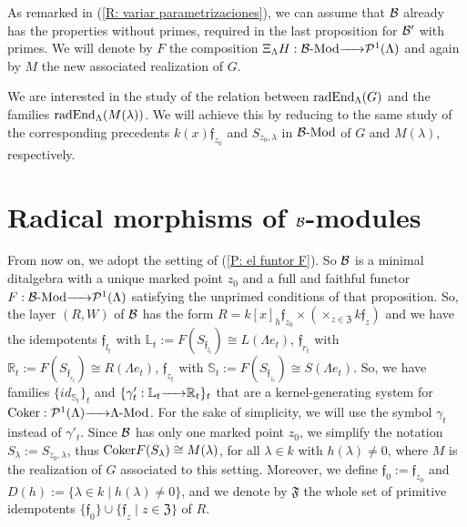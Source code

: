 \documentclass{article}
\theoremstyle{definition}
\newcommand{\End}{{ \rm End }}
\newcommand{\Coker}{{ \rm Coker }}
\newcommand{\Mod}{{ \rm Mod }}
\newcommand{\rad}{{ \rm rad }}
\renewcommand{\frak}{\mathfrak}
\newcommand{\g}{\hbox{-}}
\newcommand{\hueca}[1]{\mathbb{#1}}
\newcommand{\rightmap}[1]{\smash{\mathop{\hbox to 
20pt{\rightarrowfill}}\limits^{#1}}}
\begin{document}
As remarked in (\ref{R: variar parametrizaciones}), we can assume that ${\cal B}$ already has the properties without primes, required in the last  proposition for ${\cal B}'$ with primes. We will denote by $F$ the composition $\Xi_\Lambda H:{\cal B}\g\Mod\rightmap{}{\cal P}^1(\Lambda)$ and again by $M$ the new associated realization of $G$.   

We are interested in the study of the relation between $\rad \End_\Lambda(G)$ and the families $\rad\End_\Lambda(M(\lambda))$. We will achieve this by reducing to the same study of the corresponding precedents $k(x)\frak{f}_{z_0}$ and $S_{z_0,\lambda}$ in ${\cal B}\g\Mod$ of $G$ and $M(\lambda)$, respectively.  

\section{Radical morphisms of ${\cal B}$-modules} 

From now on, we adopt the setting of (\ref{P: el funtor F}).  So ${\cal B}$ is a minimal ditalgebra with a unique marked point $z_0$ and a full and faithful functor $F:{\cal B}\g\Mod\rightmap{}{\cal P}^1(\Lambda)$ satisfying the unprimed conditions of that proposition. So, the layer $(R,W)$ of ${\cal B}$ has the form $R = k[x]_h\frak{f}_{z_0} \times\left( \times_{z\in \frak{Z}} k\frak{f}_z\right)$ and we have the idempotents $\frak{f}_{l_t}$ with  
$\hueca{L}_t:=F (S_{\frak{f}_{l_t}})\cong  L(\Lambda e_t)$, $\frak{f}_{r_t}$ with 
$\hueca{R}_t:=
F (S_{\frak{f}_{r_t}})
\cong  
 R(\Lambda e_t)$, 
 $\frak{f}_{z_t}$ with  
$\hueca{S}_t:=
F (S_{\frak{f}_{z_t}}) 
\cong S(\Lambda e_t)$. So, we have families $\{id_{\hueca{S}_t}\}_t$ and $\{\gamma'_t:\hueca{L}_t\rightmap{}\hueca{R}_t\}_t$ that are a kernel-generating system for $\Coker:{\cal P}^1(\Lambda)\rightmap{}\Lambda\g\Mod$. For the sake of simplicity, we will use the symbol $\gamma_t$ instead of $\gamma'_t$. Since ${\cal B}$ has only one marked point $z_0$, we simplify the notation $S_\lambda:=S_{z_0,\lambda}$, thus $\Coker F(S_\lambda)\cong M(\lambda)$, for 
 all $\lambda\in k$ with $h(\lambda)\not=0$, where $M$ is the realization of $G$ associated to this setting. Moreover,  we define  $\frak{f}_0:=\frak{f}_{z_0}$ and  $D(h):=\{\lambda\in k\mid h(\lambda)\not=0\}$,  and  we denote by $\frak{F}$ the whole set of primitive idempotents 
$\{\frak{f}_0\}\cup \{\frak{f}_z\mid z\in \frak{Z}\}$ of $R$.
\end{document}
